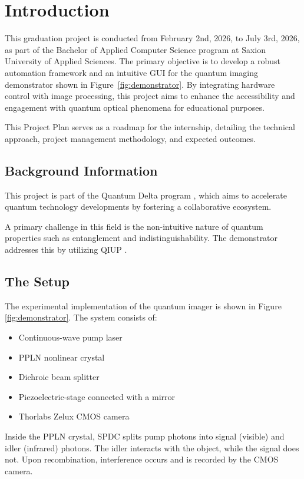 \documentclass[12pt,a4paper]{article}
\begin{document}
\section{Introduction}
This graduation project is conducted from February 2nd, 2026, to July 3rd, 2026, as part of the Bachelor of Applied Computer Science program at Saxion University of Applied Sciences. The primary objective is to develop a robust automation framework and an intuitive \ac{GUI} for the quantum imaging demonstrator shown in Figure~\ref{fig:demonstrator}. By integrating hardware control with image processing, this project aims to enhance the accessibility and engagement with quantum optical phenomena for educational purposes.

This Project Plan serves as a roadmap for the internship, detailing the technical approach, project management methodology, and expected outcomes.

\subsection{Background Information}
This project is part of the Quantum Delta program \cite{quantum_delta}, which aims to accelerate quantum technology developments by fostering a collaborative ecosystem. 

A primary challenge in this field is the non-intuitive nature of quantum properties such as entanglement and indistinguishability. The demonstrator addresses this by utilizing \ac{QIUP} \cite{lemos2014quantum}.

\subsection{The Setup}
The experimental implementation of the quantum imager is shown in Figure \ref{fig:demonstrator}. 
The system consists of:

\begin{itemize}
\item Continuous-wave pump laser
\item \ac{PPLN} nonlinear crystal
\item Dichroic beam splitter
\item Piezoelectric-stage connected with a mirror
\item Thorlabs Zelux \ac{CMOS} camera
\end{itemize}

Inside the \ac{PPLN} crystal, \ac{SPDC} splits pump photons into signal (visible) and idler (infrared) photons. The idler interacts with the object, while the signal does not. Upon recombination, interference occurs and is recorded by the \ac{CMOS} camera.
\end{document}
